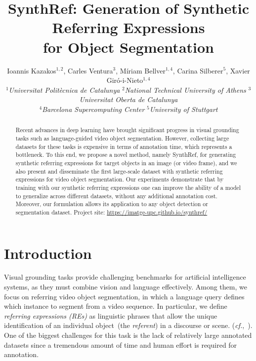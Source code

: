 \documentclass[11pt]{article}
\title{SynthRef: Generation of Synthetic Referring Expressions \\for Object Segmentation}
\author{Ioannis Kazakos$^{1,2}$, Carles Ventura$^3$, Míriam Bellver$^{1,4}$, Carina Silberer$^5$, Xavier Giró-i-Nieto$^{1,4}$  \\
   \small$^1$\emph{Universitat Politècnica de Catalunya}\quad
   \small$^2$\emph{National Technical University of Athens}\quad
    \small$^3$\emph{Universitat Oberta de Catalunya}\\
   \small$^4$\emph{Barcelona Supercomputing Center}\quad  
   \small$^5$\emph{University of Stuttgart}\\
}
\newcommand{\cf}{\textit{cf.}}
\begin{document}
\maketitle
\begin{abstract}
Recent advances in deep learning have brought significant progress 
in visual grounding tasks such as language-guided video object segmentation. However, collecting large datasets for these tasks is expensive in terms of annotation time, which represents a bottleneck. To this end, 
we propose a novel method, namely SynthRef, for generating synthetic referring expressions for target objects in an image (or video frame), and we also present and disseminate the first large-scale dataset with synthetic referring expressions for video object segmentation. Our experiments demonstrate that by training with our synthetic referring expressions one can improve the ability of a model to generalize across different datasets, without any additional annotation cost. Moreover, our formulation allows its application to any object detection or segmentation dataset. \noindent Project site: \url{https://imatge-upc.github.io/synthref/}
\end{abstract}

\section{Introduction}
\label{sec:introduction}



Visual grounding tasks provide challenging benchmarks for 
artificial intelligence systems, as they must combine vision and language effectively. 
Among them, we focus on 
referring video object segmentation, in which a language query defines which instance to segment from a video sequence. 
In particular, we define \textit{referring expressions (REs)} as linguistic phrases that allow the unique identification of an individual object~(the \textsl{referent}) in a discourse or scene. 
 (\cf,~\citealt{reiter1992fast,qiao2020referring}).
One of the biggest challenges for this task is the lack of relatively large annotated datasets since a tremendous amount of time and human effort is required for annotation.
\end{document}
